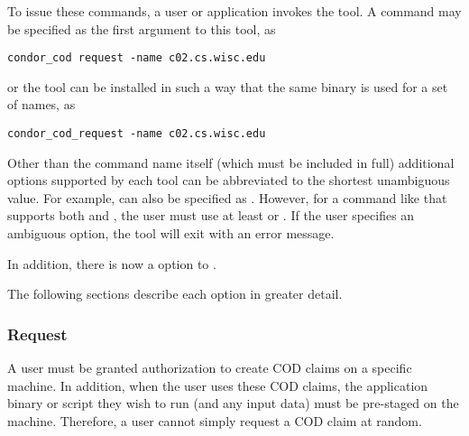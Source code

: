 To issue these commands, a user or application invokes the 
 tool.
A command may be specified as the first argument to this tool, 
as
\begin{verbatim}
condor_cod request -name c02.cs.wisc.edu
\end{verbatim}
or
the  tool can be installed in such a way that the same
binary is used for a set of names, as
\begin{verbatim}
condor_cod_request -name c02.cs.wisc.edu
\end{verbatim}

Other than the command name itself (which must be included in full)
additional options supported by each tool can be abbreviated to the
shortest unambiguous value.
For example,  can also be specified as .
However, for a command like  that supports both
 and , the user must use at least
 or .
If the user specifies an ambiguous option, the  tool will
exit with an error message.

In addition, there is now a  option to .

The following sections describe each option in greater detail.

\subsubsection{\label{sec:cod-claim-request}Request}

A user must be granted authorization to create COD
claims on a specific machine.
In addition, when the user uses these COD claims, the application
binary or script they wish to run (and any input data) must be
pre-staged on the machine.
Therefore, a user cannot simply request a COD claim at random.

